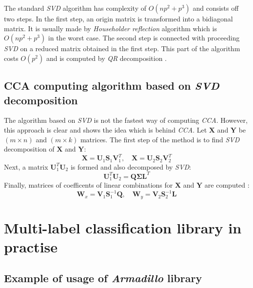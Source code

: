 \begin{appendices}
The standard \textit{SVD} algorithm has complexity of $O(np^2+p^3)$ and consists off two steps. In the first step, an origin matrix is transformed into a bidiagonal matrix. It is usually made by \textit{Householder reflection} algorithm which is $O(np^2+p^3)$ in the worst case. The second step is connected with proceeding \textit{SVD} on a reduced matrix obtained in the first step. This part of the algorithm costs $O(p^2)$ and is computed by \textit{QR} decomposition \cite{SVD}. 

\newpage
\section{CCA computing algorithm based on \textit{SVD} decomposition}
\label{app:cca}

The algorithm based on \textit{SVD} is not the fastest way of computing \textit{CCA}. However, this approach is clear and shows the idea which is behind \textit{CCA}. Let $\boldsymbol{X}$ and $\boldsymbol{Y}$ be $(m \times n)$ and $(m \times k)$ matrices. The first step of the method is to find \textit{SVD} decomposition of $\boldsymbol{X}$ and $\boldsymbol{Y}$:
\begin{equation}
    \boldsymbol{X}=\boldsymbol{U}_1\boldsymbol{S}_1\boldsymbol{V}^T_1, \quad \boldsymbol{X}=\boldsymbol{U}_2\boldsymbol{S}_2\boldsymbol{V}^T_2
\end{equation}
Next, a matrix $\boldsymbol{U}_1^T\boldsymbol{U}_2$ is formed and also decomposed by \textit{SVD}:
\begin{equation}
    \boldsymbol{U}_1^T\boldsymbol{U}_2 = \boldsymbol{Q}\boldsymbol{\Sigma}{\boldsymbol{L}^T}
\end{equation}
Finally, matrices of coefficents of linear combinations for $\boldsymbol{X}$ and $\boldsymbol{Y}$ are computed \cite{William}:
\begin{equation}
    \boldsymbol{W}_x=\boldsymbol{V}_1\boldsymbol{S}_1^{-1}\boldsymbol{Q}, \quad  \boldsymbol{W}_y=\boldsymbol{V}_2\boldsymbol{S}_2^{-1}\boldsymbol{L}
\end{equation}


\chapter{Multi-label classification library in practise}
\section{Example of usage of \textit{Armadillo} library}
\label{app:arma}



\end{appendices}
